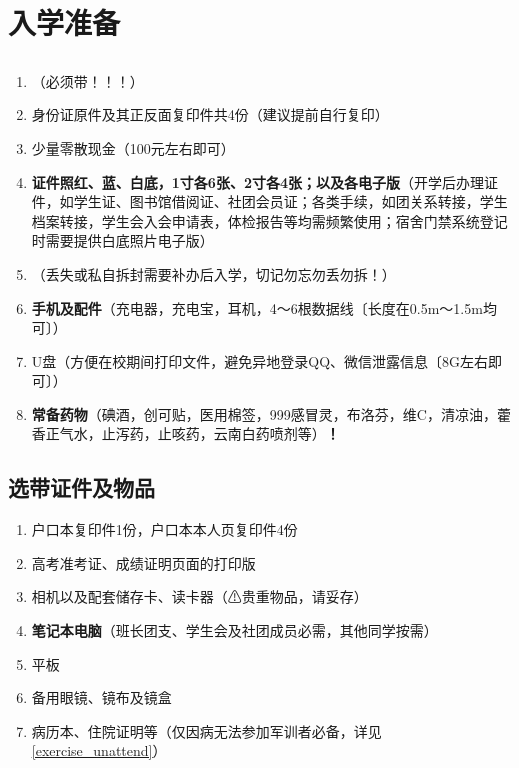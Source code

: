 \chapter[入学准备]{入学准备}

\section[必要证件及物品]{}
\begin{enumerate}
      \item \textbf{}（必须带！！！）
      \item 身份证原件及其正反面复印件共4份（建议提前自行复印）
      \item 少量零散现金（100元左右即可）\footnotemark
      \item \textbf{证件照红、蓝、白底，1寸各6张、2寸各4张；以及各电子版}（开学后办理证件，如学生证、图书馆借阅证、社团会员证；各类手续，如团关系转接，学生档案转接，学生会入会申请表，体检报告等均需频繁使用；宿舍门禁系统登记时需要提供白底照片电子版）
      \item \textbf{}（丢失或私自拆封需要补办后入学，切记勿忘勿丢勿拆！）
      \item \textbf{手机及配件}（充电器，充电宝，耳机，4～6根数据线〔长度在0.5m～1.5m均可〕）
      \item U盘（方便在校期间打印文件，避免异地登录QQ、微信泄露信息〔8G左右即可〕）
      \item \textbf{常备药物}（碘酒，创可贴，医用棉签，999感冒灵，布洛芬，维C，清凉油，藿香正气水，止泻药，止咳药，云南白药喷剂等）\textbf{！}
\end{enumerate}

\section[选带证件及物品]{选带证件及物品}
\begin{enumerate}
      \item 户口本复印件1份，户口本本人页复印件4份\footnotemark
      \item 高考准考证、成绩证明页面的打印版\footnotemark
      \item 相机以及配套储存卡、读卡器（⚠贵重物品，请妥存）
      \item \textbf{笔记本电脑}（班长团支、学生会及社团成员必需，其他同学按需）
      \item 平板\footnotemark
      \item 备用眼镜、镜布及镜盒
      \item 病历本、住院证明等（仅因病无法参加军训者必备，详见\uline{\ref{exercise_unattend}}）
\end{enumerate}


